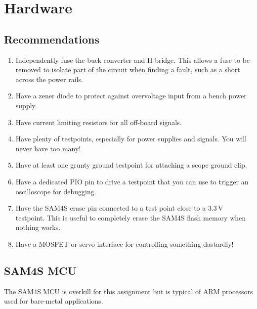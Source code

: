 \label{hardware}
\chapter{Hardware}



\section{Recommendations}\label{recommendations}

\begin{enumerate}
\item
  Independently fuse the buck converter and H-bridge. This allows a fuse
  to be removed to isolate part of the circuit when finding a fault,
  such as a short across the power rails.

\item
  Have a zener diode to protect against overvoltage input from a bench
  power supply.

\item
  Have current limiting resistors for all off-board signals.

\item
  Have plenty of testpoints, especially for power supplies and signals.
  You will never have too many!

\item
  Have at least one grunty ground testpoint for attaching a scope ground
  clip.

\item
  Have a dedicated PIO pin to drive a testpoint that you can use to
  trigger an oscilloscope for debugging.

\item
  Have the SAM4S erase pin connected to a test point close to a 3.3\,V
  testpoint. This is useful to completely erase the SAM4S flash memory
  when nothing works.

\item
  Have a MOSFET or servo interface for controlling something dastardly!
  
\end{enumerate}

\section{SAM4S MCU}\label{sam4s-mcu}

The SAM4S MCU is overkill for this assignment but is typical of
ARM processors used for bare-metal applications.

